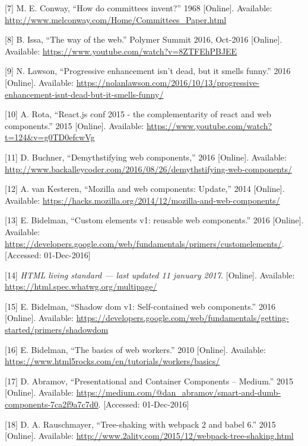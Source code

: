 \documentclass[]{article}
\begin{document}
\hypertarget{ref-Conway1968}{}
{[}7{]} M. E. Conway, ``How do committees invent?'' 1968 {[}Online{]}.
Available: \url{http://www.melconway.com/Home/Committees_Paper.html}

\hypertarget{ref-Issa2016}{}
{[}8{]} B. Issa, ``The way of the web.'' Polymer Summit 2016, Oct-2016
{[}Online{]}. Available:
\url{https://www.youtube.com/watch?v=8ZTFEhPBJEE}

\hypertarget{ref-Lawson2016}{}
{[}9{]} N. Lawson, ``Progressive enhancement isn't dead, but it smells
funny.'' 2016 {[}Online{]}. Available:
\url{https://nolanlawson.com/2016/10/13/progressive-enhancement-isnt-dead-but-it-smells-funny/}

\hypertarget{ref-Rota2015}{}
{[}10{]} A. Rota, ``React.js conf 2015 - the complementarity of react
and web components.'' 2015 {[}Online{]}. Available:
\url{https://www.youtube.com/watch?t=124\&v=g0TD0efcwVg}

\hypertarget{ref-Buchner2016}{}
{[}11{]} D. Buchner, ``Demythstifying web components,'' 2016
{[}Online{]}. Available:
\url{http://www.backalleycoder.com/2016/08/26/demythstifying-web-components/}

\hypertarget{ref-vanKesteren2014}{}
{[}12{]} A. van Kesteren, ``Mozilla and web components: Update,'' 2014
{[}Online{]}. Available:
\url{https://hacks.mozilla.org/2014/12/mozilla-and-web-components/}

\hypertarget{ref-Bidelman2016}{}
{[}13{]} E. Bidelman, ``Custom elements v1: reusable web components.''
2016 {[}Online{]}. Available:
\url{https://developers.google.com/web/fundamentals/primers/customelements/}.
{[}Accessed: 01-Dec-2016{]}

\hypertarget{ref-HTML}{}
{[}14{]} \emph{HTML living standard --- last updated 11 january 2017}.
{[}Online{]}. Available: \url{https://html.spec.whatwg.org/multipage/}

\hypertarget{ref-Bidelman2016shadow}{}
{[}15{]} E. Bidelman, ``Shadow dom v1: Self-contained web components.''
2016 {[}Online{]}. Available:
\url{https://developers.google.com/web/fundamentals/getting-started/primers/shadowdom}

\hypertarget{ref-Bidelman2010}{}
{[}16{]} E. Bidelman, ``The basics of web workers.'' 2010 {[}Online{]}.
Available: \url{https://www.html5rocks.com/en/tutorials/workers/basics/}

\hypertarget{ref-Abramov2015}{}
{[}17{]} D. Abramov, ``Presentational and Container Components --
Medium.'' 2015 {[}Online{]}. Available:
\url{https://medium.com/@dan_abramov/smart-and-dumb-components-7ca2f9a7c7d0}.
{[}Accessed: 01-Dec-2016{]}

\hypertarget{ref-Rauschmayer2015}{}
{[}18{]} D. A. Rauschmayer, ``Tree-shaking with webpack 2 and babel 6.''
2015 {[}Online{]}. Available:
\url{http://www.2ality.com/2015/12/webpack-tree-shaking.html}
\end{document}
